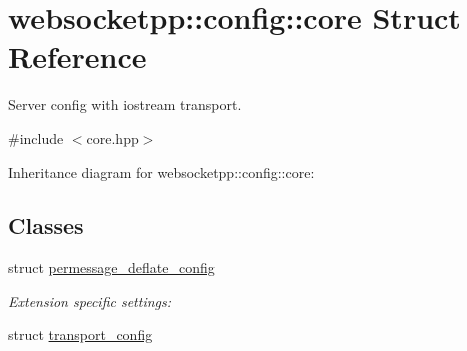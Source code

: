 \hypertarget{structwebsocketpp_1_1config_1_1core}{}\section{websocketpp\+:\+:config\+:\+:core Struct Reference}
\label{structwebsocketpp_1_1config_1_1core}


Server config with iostream transport.  




{\ttfamily \#include $<$core.\+hpp$>$}



Inheritance diagram for websocketpp\+:\+:config\+:\+:core\+:
\subsection*{Classes}
\begin{DoxyCompactItemize}
\item 
struct \mbox{\hyperlink{structwebsocketpp_1_1config_1_1core_1_1permessage__deflate__config}{permessage\+\_\+deflate\+\_\+config}}
\begin{DoxyCompactList}\small\item\em Extension specific settings\+: \end{DoxyCompactList}\item 
struct \mbox{\hyperlink{structwebsocketpp_1_1config_1_1core_1_1transport__config}{transport\+\_\+config}}
\end{DoxyCompactItemize}
